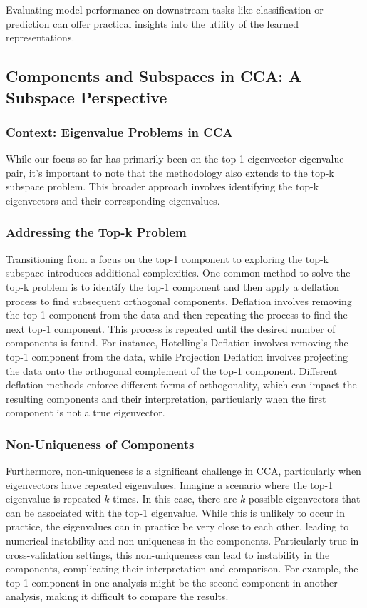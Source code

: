 Evaluating model performance on downstream tasks like classification or prediction can offer practical insights into the utility of the learned representations.

\subsection{Components and Subspaces in CCA: A Subspace Perspective}

\subsubsection{Context: Eigenvalue Problems in CCA}\label{subsec:orthogonality}

While our focus so far has primarily been on the top-1 eigenvector-eigenvalue pair, it's important to note that the methodology also extends to the top-k subspace problem. This broader approach involves identifying the top-k eigenvectors and their corresponding eigenvalues.

\subsubsection{Addressing the Top-k Problem}

Transitioning from a focus on the top-1 component to exploring the top-k subspace introduces additional complexities. One common method to solve the top-k problem is to identify the top-1 component and then apply a deflation process to find subsequent orthogonal components.
Deflation involves removing the top-1 component from the data and then repeating the process to find the next top-1 component. This process is repeated until the desired number of components is found.
For instance, Hotelling's Deflation \citep{hotelling1933analysis} involves removing the top-1 component from the data, while Projection Deflation \citep{mackey2008deflation} involves projecting the data onto the orthogonal complement of the top-1 component.
Different deflation methods enforce different forms of orthogonality, which can impact the resulting components and their interpretation, particularly when the first component is not a true eigenvector.

\subsubsection{Non-Uniqueness of Components}

Furthermore, non-uniqueness is a significant challenge in CCA, particularly when eigenvectors have repeated eigenvalues. Imagine a scenario where the top-1 eigenvalue is repeated \(k\) times. In this case, there are \(k\) possible eigenvectors that can be associated with the top-1 eigenvalue. While this is unlikely to occur in practice, the eigenvalues can in practice be very close to each other, leading to numerical instability and non-uniqueness in the components. Particularly true in cross-validation settings, this non-uniqueness can lead to instability in the components, complicating their interpretation and comparison.
For example, the top-1 component in one analysis might be the second component in another analysis, making it difficult to compare the results.

